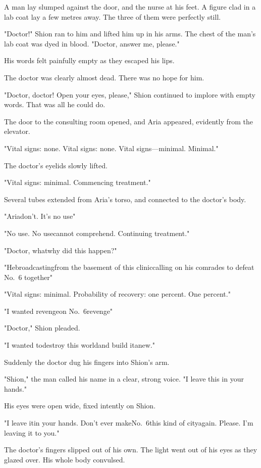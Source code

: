 A man lay slumped against the door, and the nurse at his feet. A figure
clad in a lab coat lay a few metres away. The three of them were
perfectly still.

"Doctor!" Shion ran to him and lifted him up in his arms. The chest of
the man's lab coat was dyed in blood. "Doctor, answer me, please."

His words felt painfully empty as they escaped his lips.

The doctor was clearly almost dead. There was no hope for him.

"Doctor, doctor! Open your eyes, please," Shion continued to implore
with empty words. That was all he could do.

The door to the consulting room opened, and Aria appeared, evidently
from the elevator.

{\sffamily "Vital signs: none. Vital signs: none. Vital signs---minimal. Minimal."}

The doctor's eyelids slowly lifted.

{\sffamily "Vital signs: minimal. Commencing treatment."}

Several tubes extended from Aria's torso, and connected to the doctor's
body.

"Aria\el don't. It's no use\el "

{\sffamily "No use. No use\el cannot comprehend. Continuing treatment."}

"Doctor, what\el why did this happen?"

"\el He\el broadcasting\el from the basement of this clinic\el calling\el 
on his comrades to defeat No.~6 together\el "

{\sffamily "Vital signs: minimal. Probability of recovery: one percent. One
percent."}

"I wanted revenge\el on No.~6\el revenge\el "

"Doctor," Shion pleaded.

"I wanted to\el destroy this world\el and build it\el anew."

Suddenly the doctor dug his fingers into Shion's arm.

"Shion," the man called his name in a clear, strong voice. "I leave this
in your hands."

His eyes were open wide, fixed intently on Shion.

"I leave it\el in your hands. Don't ever make\el No.~6\el this kind of
city\el again. Please. I'm leaving it to you."

The doctor's fingers slipped out of his own. The light went out of his
eyes as they glazed over. His whole body convulsed.

